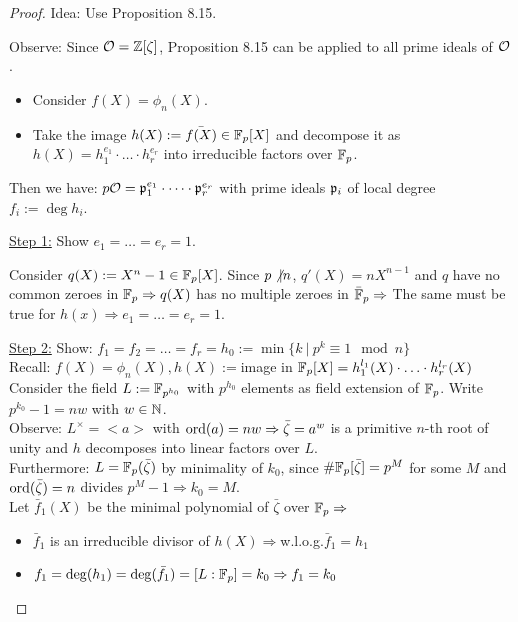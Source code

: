 


\begin{proof}
Idea: Use Proposition 8.15.

Observe: Since $\mathcal{O} = \mathbb{Z}[\zeta]$, Proposition 8.15 can be applied to all prime ideals of $\mathcal{O}$.
\begin{itemize}
	\item Consider $f(X) = \phi_n(X)$.
	
	\item Take the image $h(X) := \bar{f(X)} \in \mathbb{F}_p[X]$ and decompose it as $h(X) = h_1^{e_1} \cdot \dots \cdot h_r^{e_r}$ into irreducible factors over $\mathbb{F}_p$.
\end{itemize}
Then we have: $p \mathcal{O} = \mathfrak{p}_1^{e_1} \cdot \dots \cdot \mathfrak{p}_r^{e_r}$ with prime ideals $\mathfrak{p}_i$ of local degree $f_i := \deg h_i$.
	
\bigskip
	
\underline{Step 1:} Show $e_1 = \dots = e_r = 1$.

Consider $q(X) := X^n -1 \in \mathbb{F}_p[X]$. Since $p \not\vert n$, $q'(X) = nX^{n-1}$ and $q$ have no common zeroes in $\mathbb{F}_p \Rightarrow q(X)$ has no multiple zeroes in $\bar{\mathbb{F}}_p \Rightarrow $ The same must be true for $h(x) \Rightarrow e_1 = \dots = e_r = 1$.

\bigskip

\underline{Step 2:} Show: $f_1=f_2= \dots=f_r=h_0:=\min \{ k \ | \ p^k \equiv 1 \mod n \}$\\
Recall: $f(X)= \phi_n(X), h(X):=$image in $\mathbb{F}_p[X]=h_1^{l_1}(X)\cdot \ldots \cdot h_r^{l_r}(X)$\\
Consider the field $L:= \mathbb{F}_{p^{h_0}}$ with $p^{h_0}$ elements as field extension of $\mathbb{F}_p$.
Write $p^{k_0}-1= nw$ with $w \in \mathbb{N}$.\\
Observe: $L^\times = <a>$ with $\operatorname{ord}(a)=nw \Rightarrow \bar{\zeta}=a^w$ is a primitive $n$-th root of unity and $h$ decomposes into linear factors over $L$.\\
Furthermore: $L=\mathbb{F}_p(\bar{\zeta})$ by minimality of $k_0$, since $\# \mathbb{F}_p[\bar{\zeta}] = p^M$ for some $M$ and $\operatorname{ord}(\bar{\zeta})=n$ divides $p^M-1 \Rightarrow k_0=M$.\\
Let $\bar{f}_1(X)$ be the minimal polynomial of $\bar{\zeta}$ over $\mathbb{F}_p \Rightarrow$
\begin{itemize}
\item $\bar{f}_1$ is an irreducible divisor of $h(X) \Rightarrow $w.l.o.g.$ \bar{f}_1 = h_1$
\item $f_1=\deg(h_1)=\deg(\bar{f_1})=[L:\mathbb{F}_p]=k_0 \Rightarrow f_1=k_0$
\end{itemize} 
\end{proof}

